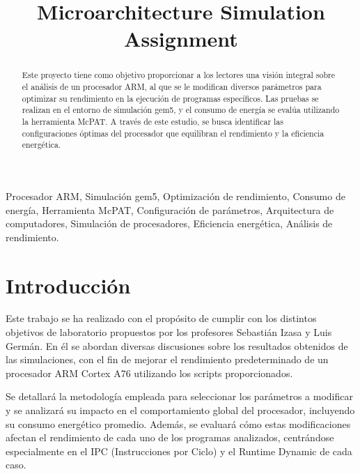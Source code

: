 \documentclass[conference]{IEEEtran}
\begin{document}
\title{Microarchitecture Simulation Assignment }

\author{
}

\maketitle

\begin{abstract}

Este proyecto tiene como objetivo proporcionar a los lectores una visión integral sobre el análisis de un procesador ARM, al que se le modifican diversos parámetros para optimizar su rendimiento en la ejecución de programas específicos. Las pruebas se realizan en el entorno de simulación gem5, y el consumo de energía se evalúa utilizando la herramienta McPAT. A través de este estudio, se busca identificar las configuraciones óptimas del procesador que equilibran el rendimiento y la eficiencia energética.

\end{abstract}

\begin{IEEEkeywords}
Procesador ARM, Simulación gem5, Optimización de rendimiento, Consumo de energía, Herramienta McPAT, Configuración de parámetros, Arquitectura de computadores, Simulación de procesadores, Eficiencia energética, Análisis de rendimiento.
\end{IEEEkeywords}

\section{Introducción}
Este trabajo se ha realizado con el propósito de cumplir con los distintos objetivos de laboratorio propuestos por los profesores Sebastián Izasa y Luis Germán. En él se abordan diversas discusiones sobre los resultados obtenidos de las simulaciones, con el fin de mejorar el rendimiento predeterminado de un procesador ARM Cortex A76 utilizando los scripts proporcionados.

Se detallará la metodología empleada para seleccionar los parámetros a modificar y se analizará su impacto en el comportamiento global del procesador, incluyendo su consumo energético promedio. Además, se evaluará cómo estas modificaciones afectan el rendimiento de cada uno de los programas analizados, centrándose especialmente en el IPC (Instrucciones por Ciclo) y el Runtime Dynamic de cada caso.
\end{document}
